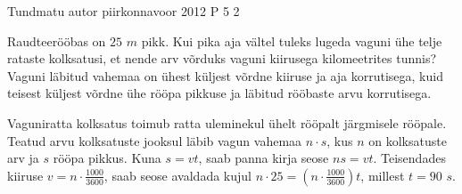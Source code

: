 {Tundmatu autor} %
{piirkonnavoor} %
{2012} %
{P 5} %
{2} %
{
\ifStatement
Raudteerööbas on $25$ $m$ pikk. Kui pika aja vältel tuleks lugeda vaguni ühe telje rataste kolksatusi, et nende arv võrduks vaguni kiirusega kilomeetrites tunnis?
\fi
Vaguni läbitud vahemaa on ühest küljest võrdne kiiruse ja aja korrutisega, kuid teisest küljest võrdne ühe rööpa pikkuse ja läbitud rööbaste arvu korrutisega.
\ifHint

\fi

\ifSolution

Vaguniratta kolksatus toimub ratta uleminekul ühelt rööpalt järgmisele rööpale. Teatud arvu kolksatuste jooksul läbib vagun vahemaa $n \cdot s$, kus $n$ on kolksatuste arv ja $s$ rööpa pikkus. Kuna $s = vt$, saab panna kirja seose $ns = vt$. Teisendades kiiruse $v = n \cdot \frac{1000}{3600}$, saab seose avaldada kujul $n \cdot 25 = (n \cdot \frac{1000}{3600})t$, millest $t = 90$ $s$.
\fi
}
